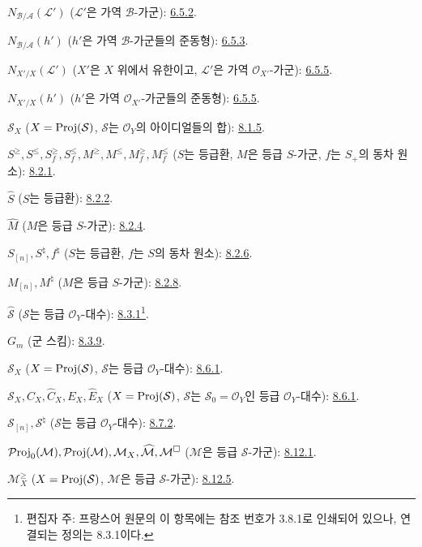 $N_{\mathcal{B}/\mathcal{A}}(\mathcal{L}')$
($\mathcal{L}'$은 가역 $\mathcal{B}$-가군): \hyperref[II.6.5.2-ko]{6.5.2}.

$N_{\mathcal{B}/\mathcal{A}}(h')$
($h'$은 가역 $\mathcal{B}$-가군들의 준동형): \hyperref[II.6.5.3-ko]{6.5.3}.

$N_{X'/X}(\mathcal{L}')$
($X'$은 $X$ 위에서 유한이고, $\mathcal{L}'$은 가역 $\mathcal{O}_{X'}$-가군): \hyperref[II.6.5.5-ko]{6.5.5}.

$N_{X'/X}(h')$
($h'$은 가역 $\mathcal{O}_{X'}$-가군들의 준동형): \hyperref[II.6.5.5-ko]{6.5.5}.

$\mathcal{S}_X$ ($X=\operatorname{Proj}(\mathcal{S})$, $\mathcal{S}$는
$\mathcal{O}_Y$의 아이디얼들의 합): \hyperref[II.8.1.5-ko]{8.1.5}.

$S^\geq,S^\leq,S_f^\geq,S_f^\leq,
M^\geq,M^\leq,M_f^\geq,M_f^\leq$
($S$는 등급환, $M$은 등급 $S$-가군,
$f$는 $S_+$의 동차 원소): \hyperref[II.8.2.1-ko]{8.2.1}.

$\widehat S$ ($S$는 등급환): \hyperref[II.8.2.2-ko]{8.2.2}.

$\widehat M$ ($M$은 등급 $S$-가군): \hyperref[II.8.2.4-ko]{8.2.4}.

$S_{[n]},S^\natural,f^\natural$
($S$는 등급환, $f$는 $S$의 동차 원소): \hyperref[II.8.2.6-ko]{8.2.6}.

$M_{[n]},M^\natural$ ($M$은 등급 $S$-가군): \hyperref[II.8.2.8-ko]{8.2.8}.

$\widehat{\mathcal{S}}$ ($\mathcal{S}$는 등급 $\mathcal{O}_Y$-대수):
\hyperref[II.8.3.1-ko]{8.3.1}\footnote{편집자 주: 프랑스어 원문의 이 항목에는 참조 번호가 3.8.1로 인쇄되어 있으나, 연결되는 정의는 8.3.1이다.}.

$G_m$ (군 스킴): \hyperref[II.8.3.9-ko]{8.3.9}.

$\mathcal{S}_X$ ($X=\operatorname{Proj}(\mathcal{S})$, $\mathcal{S}$는 등급 $\mathcal{O}_Y$-대수): \hyperref[II.8.6.1-ko]{8.6.1}.

$\mathcal{S}_X,C_X,\widehat C_X,E_X,\widehat E_X$
($X=\operatorname{Proj}(\mathcal{S})$, $\mathcal{S}$는 $\mathcal{S}_0=\mathcal{O}_Y$인
등급 $\mathcal{O}_Y$-대수): \hyperref[II.8.6.1-ko]{8.6.1}.

$\mathcal{S}_{[n]},\mathcal{S}^{\natural}$
($\mathcal{S}$는 등급 $\mathcal{O}_Y$-대수): \hyperref[II.8.7.2-ko]{8.7.2}.

$\mathcal{P}\!\operatorname{roj}_0(\mathcal{M}),\mathcal{P}\!\operatorname{roj}(\mathcal{M}),\mathcal{M}_X,
\widehat{\mathcal{M}},\mathcal{M}^{\square}$
($\mathcal{M}$은 등급 $\mathcal{S}$-가군): \hyperref[II.8.12.1-ko]{8.12.1}.

$\mathcal{M}_X^\geq$
($X=\operatorname{Proj}(\mathcal{S})$, $\mathcal{M}$은 등급 $\mathcal{S}$-가군): \hyperref[II.8.12.5-ko]{8.12.5}.

